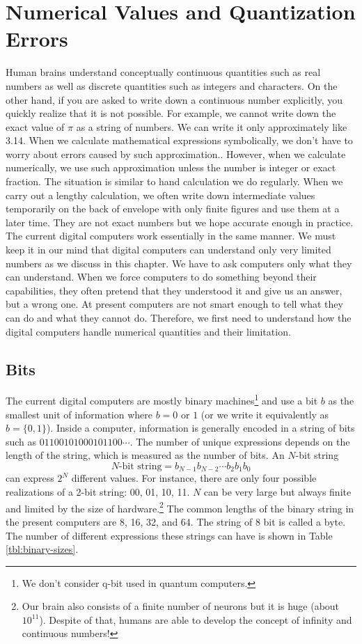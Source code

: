 \chapter{Numerical Values and Quantization Errors}\label{ch:numbers}

Human brains understand conceptually continuous quantities such as real numbers as well as discrete quantities such as integers and characters.  On the other hand, if you are asked to write down a continuous number explicitly, you quickly realize that it is not possible. For example, we cannot write down the exact value of $\pi$ as a string of numbers.  We can write it only approximately like 3.14. When we calculate mathematical expressions symbolically, we don't have to worry about errors caused by such approximation..  However, when we calculate numerically, we use such approximation unless the number is integer or exact fraction.  The situation is similar to hand calculation we do regularly. When we carry out a lengthy calculation, we often write down intermediate values temporarily on the back of envelope with only finite figures and use them at a later time.  They are not exact numbers but we hope accurate enough in practice. The current digital computers work essentially in the same manner. 
We must keep it in our mind that digital computers can understand only very limited numbers as we discuss in this chapter. We have to ask computers only what they can understand. When we force computers to do something beyond their capabilities, they often pretend that they understood it and give us an answer, but a wrong one.  At present computers are not smart enough to tell what they can do and what they cannot do.  Therefore, we first need to understand how the digital computers handle numerical quantities and their limitation.
 
\section{Bits}

The current digital computers are mostly binary machines\footnote{We don't consider q-bit used in quantum computers.} and use a bit $b$ as the smallest unit of information where $b=0$ or $1$ (or we write it equivalently as $b=\{0,1\}$). Inside a computer,  information is generally encoded in a string of bits such as $01100101000101100\cdots$.  The number of unique expressions depends on the length of the string, which is measured as the number of bits. An $N$-bit string
\[
N\text{-bit string} = b_{N-1} b_{N-2} \cdots b_2 b_1 b_0
\]
can express $2^N$ different values.  For instance, there are only four possible realizations of a 2-bit string: 00, 01, 10, 11.  $N$ can be very large but always finite and limited by the size of hardware.\footnote{Our brain also consists of a finite number of neurons but it is huge (about $10^{11}$). Despite of that, humans are able to develop the concept of infinity and continuous numbers!}
The common lengths of the binary string in the present computers are 8, 16, 32, and 64.   The string of 8 bit is called a byte.  The number of different expressions these strings can have is shown in Table \ref{tbl:binary-sizes}.


